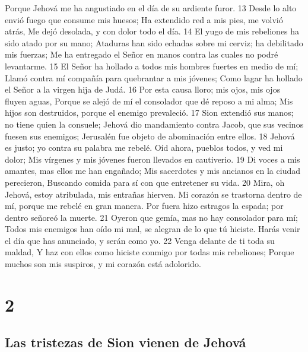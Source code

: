 Porque Jehová me ha angustiado en el día de su ardiente furor.
13 Desde lo alto envió fuego que consume mis huesos;
Ha extendido red a mis pies, me volvió atrás,
Me dejó desolada, y con dolor todo el día.
14 El yugo de mis rebeliones ha sido atado por su mano;
Ataduras han sido echadas sobre mi cerviz; ha debilitado mis fuerzas;
Me ha entregado el Señor en manos contra las cuales no podré levantarme.
15 El Señor ha hollado a todos mis hombres fuertes en medio de mí;
Llamó contra mí compañía para quebrantar a mis jóvenes;
Como lagar ha hollado el Señor a la virgen hija de Judá.
16 Por esta causa lloro; mis ojos, mis ojos fluyen aguas,
Porque se alejó de mí el consolador que dé reposo a mi alma;
Mis hijos son destruidos, porque el enemigo prevaleció.
17 Sion extendió sus manos; no tiene quien la consuele;
Jehová dio mandamiento contra Jacob, que sus vecinos fuesen sus enemigos;
Jerusalén fue objeto de abominación entre ellos.
18 Jehová es justo; yo contra su palabra me rebelé.
Oíd ahora, pueblos todos, y ved mi dolor;
Mis vírgenes y mis jóvenes fueron llevados en cautiverio.
19 Di voces a mis amantes, mas ellos me han engañado;
Mis sacerdotes y mis ancianos en la ciudad perecieron,
Buscando comida para sí con que entretener su vida.
20 Mira, oh Jehová, estoy atribulada, mis entrañas hierven.
Mi corazón se trastorna dentro de mí, porque me rebelé en gran manera.
Por fuera hizo estragos la espada; por dentro señoreó la muerte.
21 Oyeron que gemía, mas no hay consolador para mí;
Todos mis enemigos han oído mi mal, se alegran de lo que tú hiciste.
Harás venir el día que has anunciado, y serán como yo.
22 Venga delante de ti toda su maldad,
Y haz con ellos como hiciste conmigo por todas mis rebeliones;
Porque muchos son mis suspiros, y mi corazón está adolorido.

\chapter{2}

\section*{Las tristezas de Sion vienen de Jehová}

